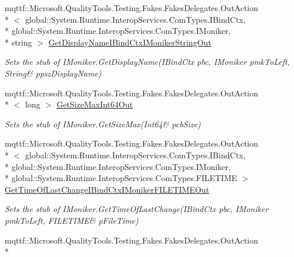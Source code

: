 \begin{DoxyCompactItemize}
mqttf\-::\-Microsoft.\-Quality\-Tools.\-Testing.\-Fakes.\-Fakes\-Delegates.\-Out\-Action\\*
$<$ global\-::\-System.\-Runtime.\-Interop\-Services.\-Com\-Types.\-I\-Bind\-Ctx, \\*
global\-::\-System.\-Runtime.\-Interop\-Services.\-Com\-Types.\-I\-Moniker, \\*
string $>$ \hyperlink{class_system_1_1_runtime_1_1_interop_services_1_1_com_types_1_1_fakes_1_1_stub_i_moniker_ac404d987eb628e569c56ae281a7a4c9b}{Get\-Display\-Name\-I\-Bind\-Ctx\-I\-Moniker\-String\-Out}
\begin{DoxyCompactList}\small\item\em Sets the stub of I\-Moniker.\-Get\-Display\-Name(I\-Bind\-Ctx pbc, I\-Moniker pmk\-To\-Left, String\& ppsz\-Display\-Name)\end{DoxyCompactList}\item 
mqttf\-::\-Microsoft.\-Quality\-Tools.\-Testing.\-Fakes.\-Fakes\-Delegates.\-Out\-Action\\*
$<$ long $>$ \hyperlink{class_system_1_1_runtime_1_1_interop_services_1_1_com_types_1_1_fakes_1_1_stub_i_moniker_abcc647ec6bd16035208ec9224300d4b1}{Get\-Size\-Max\-Int64\-Out}
\begin{DoxyCompactList}\small\item\em Sets the stub of I\-Moniker.\-Get\-Size\-Max(Int64\& pcb\-Size)\end{DoxyCompactList}\item 
mqttf\-::\-Microsoft.\-Quality\-Tools.\-Testing.\-Fakes.\-Fakes\-Delegates.\-Out\-Action\\*
$<$ global\-::\-System.\-Runtime.\-Interop\-Services.\-Com\-Types.\-I\-Bind\-Ctx, \\*
global\-::\-System.\-Runtime.\-Interop\-Services.\-Com\-Types.\-I\-Moniker, \\*
global\-::\-System.\-Runtime.\-Interop\-Services.\-Com\-Types.\-F\-I\-L\-E\-T\-I\-M\-E $>$ \hyperlink{class_system_1_1_runtime_1_1_interop_services_1_1_com_types_1_1_fakes_1_1_stub_i_moniker_a5939057db6af8cb049d45dbf826a60a5}{Get\-Time\-Of\-Last\-Change\-I\-Bind\-Ctx\-I\-Moniker\-F\-I\-L\-E\-T\-I\-M\-E\-Out}
\begin{DoxyCompactList}\small\item\em Sets the stub of I\-Moniker.\-Get\-Time\-Of\-Last\-Change(I\-Bind\-Ctx pbc, I\-Moniker pmk\-To\-Left, F\-I\-L\-E\-T\-I\-M\-E\& p\-File\-Time)\end{DoxyCompactList}\item 
mqttf\-::\-Microsoft.\-Quality\-Tools.\-Testing.\-Fakes.\-Fakes\-Delegates.\-Out\-Action\\*

\end{DoxyCompactItemize}
